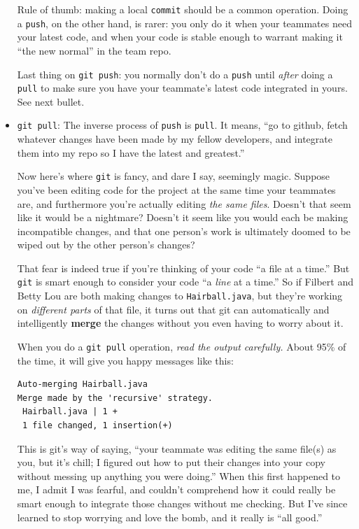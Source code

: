 \begin{itemize}
Rule of thumb: making a local \texttt{commit} should be a common operation.
Doing a \texttt{push}, on the other hand, is rarer: you only do it when your
teammates need your latest code, and when your code is stable enough to
warrant making it ``the new normal'' in the team repo.

Last thing on \texttt{git push}: you normally don't do a \texttt{push} until
\textit{after} doing a \texttt{pull} to make sure you have your teammate's
latest code integrated in yours. See next bullet.

\item \texttt{git pull}: The inverse process of \texttt{push} is
\texttt{pull}. It means, ``go to github, fetch whatever changes have been made
by my fellow developers, and integrate them into my repo so I have the latest
and greatest.''

Now here's where \texttt{git} is fancy, and dare I say, seemingly magic.
Suppose you've been editing code for the project at the same time your
teammates are, and furthermore you're actually editing \textit{the same
files}. Doesn't that seem like it would be a nightmare? Doesn't it seem like
you would each be making incompatible changes, and that one person's work is
ultimately doomed to be wiped out by the other person's changes?

That fear is indeed true if you're thinking of your code ``a file at a time.''
But \texttt{git} is smart enough to consider your code ``a \textit{line} at a
time.'' So if Filbert and Betty Lou are both making changes to
\texttt{Hairball.java}, but they're working on \textit{different parts} of
that file, it turns out that git can automatically and intelligently
\textbf{merge} the changes without you even having to worry about it.

When you do a \texttt{git pull} operation, \textit{read the output carefully.}
About 95\% of the time, it will give you happy messages like this:

\begin{Verbatim}[fontsize=\small,samepage=true,frame=none]
Auto-merging Hairball.java
Merge made by the 'recursive' strategy.
 Hairball.java | 1 +
 1 file changed, 1 insertion(+)
\end{Verbatim}

This is git's way of saying, ``your teammate was editing the same file(s) as
you, but it's chill; I figured out how to put their changes into your copy
without messing up anything you were doing.'' When this first happened to me,
I admit I was fearful, and couldn't comprehend how it could really be smart
enough to integrate those changes without me checking. But I've since learned
to stop worrying and love the bomb, and it really is ``all good.''


\end{itemize}
